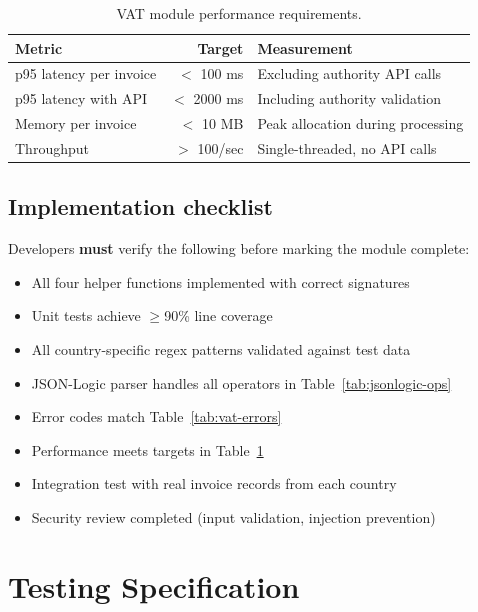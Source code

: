 \documentclass[11pt,a4paper,twoside]{report}
\begin{document}
\begin{table}[htbp]
\centering
\caption{VAT module performance requirements.}
\label{tab:vat-perf}
\footnotesize
\begin{tabularx}{\linewidth}{@{}l r X@{}}
\toprule
\textbf{Metric} & \textbf{Target} & \textbf{Measurement} \\ \midrule
p95 latency per invoice & $<$ 100 ms & Excluding authority API calls \\
p95 latency with API    & $<$ 2000 ms & Including authority validation \\
Memory per invoice      & $<$ 10 MB & Peak allocation during processing \\
Throughput              & $>$ 100/sec & Single-threaded, no API calls \\
\bottomrule
\end{tabularx}
\end{table}

\section{Implementation checklist}

Developers \textbf{must} verify the following before marking the module
complete:

\begin{itemize}
\item[\texttt{[ ]}] All four helper functions implemented with correct signatures
\item[\texttt{[ ]}] Unit tests achieve $\geq$90\% line coverage
\item[\texttt{[ ]}] All country-specific regex patterns validated against test data
\item[\texttt{[ ]}] JSON-Logic parser handles all operators in Table~\ref{tab:jsonlogic-ops}
\item[\texttt{[ ]}] Error codes match Table~\ref{tab:vat-errors}
\item[\texttt{[ ]}] Performance meets targets in Table~\ref{tab:vat-perf}
\item[\texttt{[ ]}] Integration test with real invoice records from each country
\item[\texttt{[ ]}] Security review completed (input validation, injection prevention)
\end{itemize}
\chapter{Testing Specification}\label{ch:testing}
\end{document}
